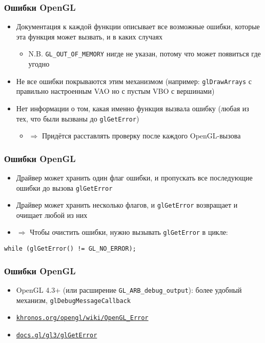 \documentclass{beamer}
\begin{document}
\begin{frame}[fragile]
\frametitle{Ошибки OpenGL}
\begin{itemize}
\item Документация к каждой функции описывает все возможные ошибки, которые эта функция может вызвать, и в каких случаях
\pause
\begin{itemize}
\item N.B. \verb|GL_OUT_OF_MEMORY| нигде не указан, потому что может появиться где угодно
\end{itemize}
\pause
\item Не все ошибки покрываются этим механизмом (например: \verb|glDrawArrays| с правильно настроенным VAO но с пустым VBO с вершинами)
\pause
\item Нет информации о том, какая именно функция вызвала ошибку (любая из тех, что были вызваны до \verb|glGetError|)
\pause
\begin{itemize}
\item \begin{math}\Rightarrow\end{math} Придётся расставлять проверку после каждого OpenGL-вызова
\end{itemize}
\end{itemize}
\end{frame}

\begin{frame}[fragile]
\frametitle{Ошибки OpenGL}
\begin{itemize}
\item Драйвер может хранить один флаг ошибки, и пропускать все последующие ошибки до вызова \verb|glGetError|
\pause
\item Драйвер может хранить несколько флагов, и \verb|glGetError| возвращает и очищает любой из них
\pause
\item \begin{math}\Rightarrow\end{math} Чтобы очистить ошибки, нужно вызывать \verb|glGetError| в цикле:
\end{itemize}
\begin{verbatim}
while (glGetError() != GL_NO_ERROR);
\end{verbatim}
\end{frame}

\begin{frame}[fragile]
\frametitle{Ошибки OpenGL}
\begin{itemize}
\item OpenGL 4.3+ (или расширение \verb|GL_ARB_debug_output|): более удобный механизм, \verb|glDebugMessageCallback|
\pause
\item \href{https://www.khronos.org/opengl/wiki/OpenGL_Error}{\nolinkurl{khronos.org/opengl/wiki/OpenGL\_Error}}
\item \href{https://docs.gl/gl3/glGetError}{\nolinkurl{docs.gl/gl3/glGetError}}
\end{itemize}
\end{frame}
\end{document}

